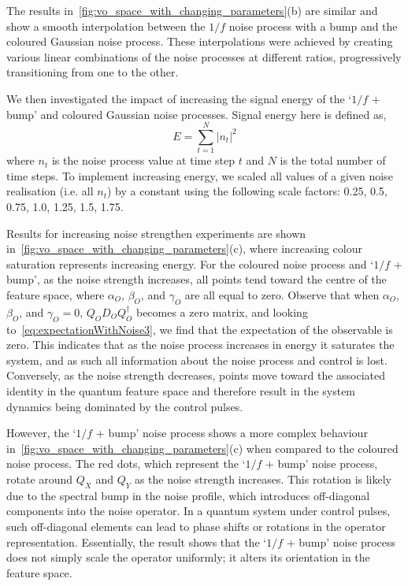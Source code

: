 \documentclass[12pt]{iopart}
\begin{document}
The results in~\cref{fig:vo_space_with_changing_parameters}(b) are similar and show a smooth interpolation between the $1/f$ noise process with a bump and the coloured Gaussian noise process. These interpolations were achieved by creating various linear combinations of the noise processes at different ratios, progressively transitioning from one to the other.

We then investigated the impact of increasing the signal energy of the `$1/f$ + bump' and coloured Gaussian noise processes.  Signal energy here is defined as,
\begin{equation}
    \label{eq:signal_energy}
    E = \sum_{t=1}^{N} \left|n_t\right|^2
\end{equation}
where $n_t$ is the noise process value at time step $t$ and $N$ is the total number of time steps. To implement increasing energy, we scaled all values of a given noise realisation (i.e. all $n_t$) by a constant using the following scale factors: 0.25, 0.5, 0.75, 1.0, 1.25, 1.5, 1.75.

Results for increasing noise strengthen experiments are shown in~\cref{fig:vo_space_with_changing_parameters}(c), where increasing colour saturation represents increasing energy. For the coloured noise process and `$1/f$ + bump', as the noise strength increases, all points tend toward the centre of the feature space, where $\alpha_O$, $\beta_O$, and $\gamma_O$ are all equal to zero. Observe that when $\alpha_O$, $\beta_O$, and $\gamma_O = 0$, $Q_OD_OQ_O^{\dagger}$ becomes a zero matrix, and looking to~\cref{eq:expectationWithNoise3}, we find that the expectation of the observable is zero. This indicates that as the noise process increases in energy it saturates the system, and as such all information about the noise process and control is lost. Conversely, as the noise strength decreases, points move toward the associated identity in the quantum feature space and therefore result in the system dynamics being dominated by the control pulses.

However, the `$1/f$ + bump' noise process shows a more complex behaviour in~\cref{fig:vo_space_with_changing_parameters}(c) when compared to the coloured noise process. The red dots, which represent the `$1/f$ + bump' noise process, rotate around $Q_X$ and $Q_Y$ as the noise strength increases. This rotation is likely due to the spectral bump in the noise profile, which introduces off-diagonal components into the noise operator. In a quantum system under control pulses, such off-diagonal elements can lead to phase shifts or rotations in the operator representation. Essentially, the result shows that the `$1/f$ + bump' noise process does not simply scale the operator uniformly; it alters its orientation in the feature space.
\end{document}
